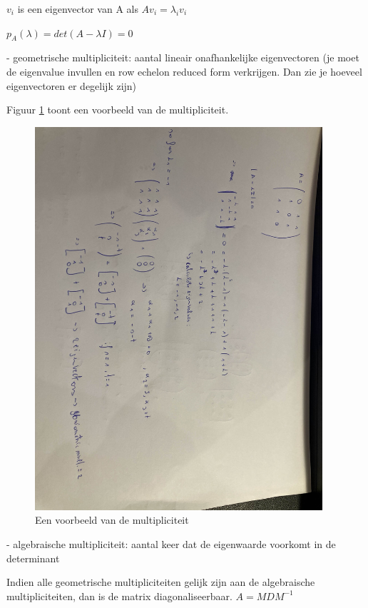 \documentclass[a4paper]{report}
\begin{document}
$v_i$ is een eigenvector van A als $Av_i = \lambda_i v_i$

$p_A(\lambda) = det(A - \lambda I) = 0$

- geometrische multipliciteit: aantal lineair onafhankelijke eigenvectoren (je moet de eigenvalue invullen en row echelon reduced form verkrijgen. Dan zie je hoeveel eigenvectoren er degelijk zijn)

Figuur \ref{fig:mult} toont een voorbeeld van de multipliciteit.

\begin{figure}[htbp!]
	\begin{center}
		\includegraphics[width=0.95\textwidth]{./images/mult.jpg}
	\end{center}
	\caption{Een voorbeeld van de multipliciteit}
	\label{fig:mult}
\end{figure}

- algebraische multipliciteit: aantal keer dat de eigenwaarde voorkomt in de determinant

Indien alle geometrische multipliciteiten gelijk zijn aan de algebraische multipliciteiten, dan is de matrix diagonaliseerbaar.
$A = MDM^{-1}$
\end{document}

